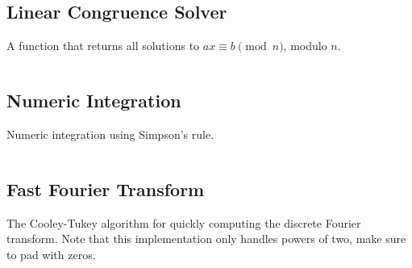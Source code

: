 \documentclass[9pt,a4paper,twocolumn,landscape,oneside]{amsart}
\newcommand{\code}[1]{\inputminted{cpp}{_code/#1}}
\begin{document}
    \subsection{Linear Congruence Solver}
        A function that returns all solutions to $ax \equiv b \pmod{n}$, modulo $n$.
        \code{mathematics/linear_congruence.cpp}

    \subsection{Numeric Integration}
        Numeric integration using Simpson's rule.
        \code{mathematics/numeric_integration.cpp}

    \subsection{Fast Fourier Transform}
        The Cooley-Tukey algorithm for quickly computing the discrete Fourier
        transform. Note that this implementation only handles powers of two,
        make sure to pad with zeros.
        \code{mathematics/fft.cpp}
\end{document}
